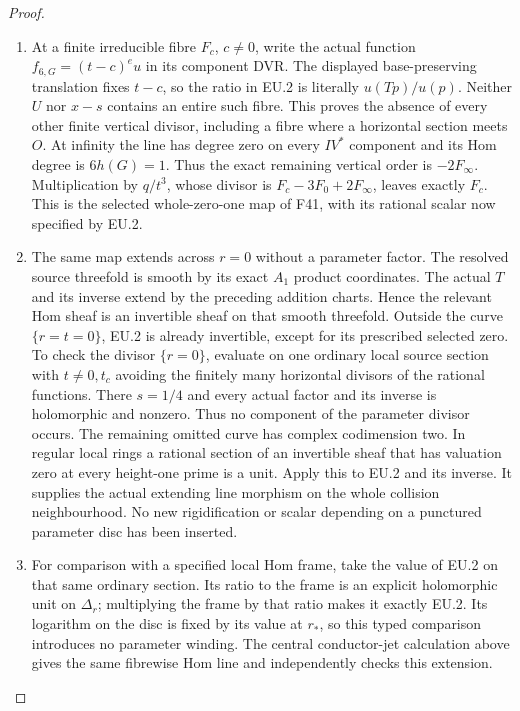 \begin{proof}
\begin{enumerate}[label=\arabic*.]
\item At a finite irreducible fibre \(F_c\), \(c\ne0\), write the actual
function \(f_{6,G}=(t-c)^e u\) in its component DVR. The displayed
base-preserving translation fixes \(t-c\), so the ratio in EU.2 is
literally \(u(Tp)/u(p)\). Neither \(U\) nor \(x-s\) contains an
entire such fibre. This proves the absence of every other finite
vertical divisor, including a fibre where a horizontal section
meets \(O\). At infinity the line has degree zero on every \(IV^*\)
component and its Hom degree is \(6h(G)=1\). Thus the exact remaining
vertical order is \(-2F_\infty\). Multiplication by \(q/t^3\), whose
divisor is \(F_c-3F_0+2F_\infty\), leaves exactly \(F_c\). This is
the selected whole-zero-one map of F41, with its rational scalar now
specified by EU.2.

\item The same map extends across \(r=0\) without a parameter factor. The
resolved source threefold is smooth by its exact \(A_1\) product
coordinates. The actual \(T\) and its inverse extend by the preceding
addition charts. Hence the relevant Hom sheaf is an invertible sheaf
on that smooth threefold. Outside the curve \(\{r=t=0\}\), EU.2 is
already invertible, except for its prescribed selected zero. To check
the divisor \(\{r=0\}\), evaluate on one ordinary local source
section with \(t\ne0,t_c\) avoiding the finitely many horizontal
divisors of the rational functions. There \(s=1/4\) and every actual
factor and its inverse is holomorphic and nonzero. Thus no component
of the parameter divisor occurs. The remaining omitted curve has
complex codimension two. In regular local rings a rational section
of an invertible sheaf that has valuation zero at every height-one
prime is a unit. Apply this to EU.2 and its inverse. It supplies the
actual extending line morphism on the whole collision neighbourhood.
No new rigidification or scalar depending on a punctured parameter
disc has been inserted.

\item For comparison with a specified local Hom frame, take the value of
EU.2 on that same ordinary section. Its ratio to the frame is an
explicit holomorphic unit on \(\Delta_r\); multiplying the frame by
that ratio makes it exactly EU.2. Its logarithm on the disc is fixed
by its value at \(r_*\), so this typed comparison introduces no
parameter winding. The central conductor-jet calculation above gives
the same fibrewise Hom line and independently checks this extension.

\par


\end{enumerate}
\end{proof}
